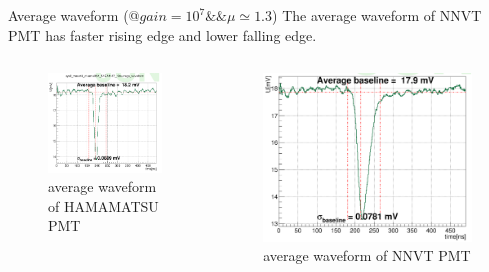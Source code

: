 \begin{frame}{Average waveform (@$gain=10^7\&\&\mu\simeq 1.3$)}
The average waveform of NNVT PMT has faster rising edge and lower falling edge.
\vspace{-.3cm}
\begin{columns}
\begin{column}{.5\textwidth}
\begin{figure}
\centering
\includegraphics[width=\textwidth]{figures/avewave.png} %
\caption{average waveform of HAMAMATSU PMT}
\end{figure}
\end{column}
\begin{column}{.5\textwidth}
\begin{figure}
\centering
\includegraphics[width=\textwidth]{figures/mcpavewave.png} %
\caption{average waveform of NNVT PMT}
\end{figure}
\end{column}
\end{columns}
\end{frame}

